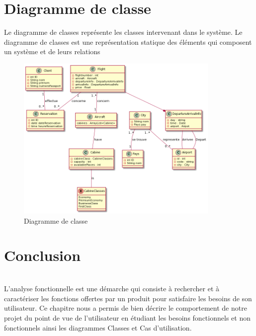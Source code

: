\newpage
\section{Diagramme de classe}
Le diagramme de classes représente les classes intervenant dans le système. Le diagramme de classes est une représentation statique des éléments qui composent un système et de leurs relations

\begin{figure}[!h]
\begin{center}
\includegraphics[height=8cm]{Pictures/Diag de classe.png}
\end{center}
\caption{Diagramme de classe}
\end{figure}
\section{Conclusion}

\\ L’analyse fonctionnelle est une démarche qui consiste à rechercher et à caractériser les fonctions offertes par un produit pour satisfaire les besoins de son utilisateur. Ce chapitre nous a permis de bien décrire le comportement de notre projet du point de vue de l’utilisateur en étudiant les besoins fonctionnels et non fonctionnels ainsi les diagrammes Classes et Cas d'utilisation.